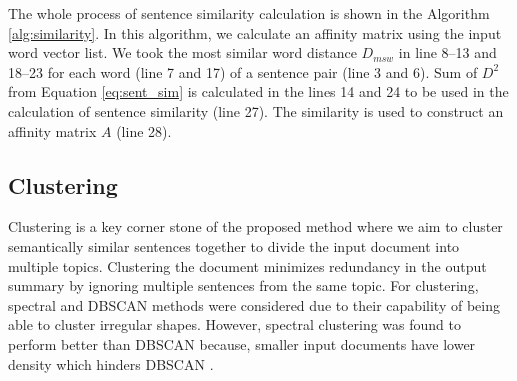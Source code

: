 \documentclass[acmlarge]{acmart}
\begin{document}
The whole process of sentence similarity calculation is shown in the Algorithm \ref{alg:similarity}. In this algorithm, we calculate an affinity matrix using the input word vector list. We took the most similar word distance $D_{msw}$ in line 8--13 and 18--23 for each word (line 7 and 17) of a sentence pair (line 3 and 6). Sum of $D^2$ from Equation \ref{eq:sent_sim} is calculated in the lines 14 and 24 to be used in the calculation of sentence similarity (line 27). The similarity is used to construct an affinity matrix $A$ (line 28).

\subsection{Clustering}\label{subsec:clustering}
Clustering is a key corner stone of the proposed method where we aim to cluster semantically similar sentences together to divide the input document into multiple topics. Clustering the document minimizes redundancy in the output summary by ignoring multiple sentences from the same topic. For clustering, spectral and DBSCAN methods were considered due to their capability of being able to cluster irregular shapes. However, spectral clustering was found to perform better than DBSCAN because, smaller input documents have lower density which hinders DBSCAN \cite{roychowdhury-etal-2022-spectral-base}.
\end{document}
